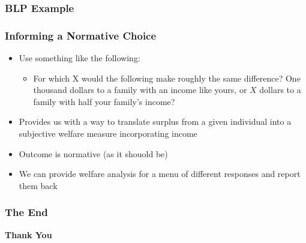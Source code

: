 \documentclass{beamer}
\begin{document}
\begin{frame}
\frametitle{BLP Example}




\end{frame}




\begin{frame}
\frametitle{Informing a Normative Choice}

\begin{itemize}
	
	\item Use something like the following:
	\begin{itemize}
		
		
		\item For which X would the following make roughly the same difference? One thousand dollars to a family with an income like yours, or $X$ dollars to a family with half your family's income? 
	\end{itemize}
	
	\item Provides us with a way to translate surplus from a given individual into a subjective welfare measure incorporating income
	\item Outcome is normative (as it shouold be) 
	\item We can provide welfare analysis for a menu of different responses and report them back
\end{itemize}	


\end{frame}



\begin{frame}

\frametitle{The End }

\begin{center}
	
\begin{Huge}
\textbf{Thank You}
\end{Huge}
\end{center}
\end{frame}

\end{document}
